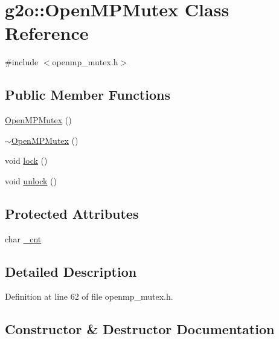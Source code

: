 \hypertarget{classg2o_1_1OpenMPMutex}{}\section{g2o\+:\+:Open\+M\+P\+Mutex Class Reference}
\label{classg2o_1_1OpenMPMutex}


{\ttfamily \#include $<$openmp\+\_\+mutex.\+h$>$}

\subsection*{Public Member Functions}
\begin{DoxyCompactItemize}
\item 
\hyperlink{classg2o_1_1OpenMPMutex_a6da42eedf0311e2fea758220a8ec687a}{Open\+M\+P\+Mutex} ()
\item 
\hyperlink{classg2o_1_1OpenMPMutex_a9b69c2121719115dd6c70738eccf5c1f}{$\sim$\+Open\+M\+P\+Mutex} ()
\item 
void \hyperlink{classg2o_1_1OpenMPMutex_aa79e59ebdd67ba8c2bac379a98dc6855}{lock} ()
\item 
void \hyperlink{classg2o_1_1OpenMPMutex_a63ec384d3012af5c42fe379df2e3901a}{unlock} ()
\end{DoxyCompactItemize}
\subsection*{Protected Attributes}
\begin{DoxyCompactItemize}
\item 
char \hyperlink{classg2o_1_1OpenMPMutex_a0cb363393694ee0dd15f822fbda7645a}{\+\_\+cnt}
\end{DoxyCompactItemize}


\subsection{Detailed Description}


Definition at line 62 of file openmp\+\_\+mutex.\+h.



\subsection{Constructor \& Destructor Documentation}
